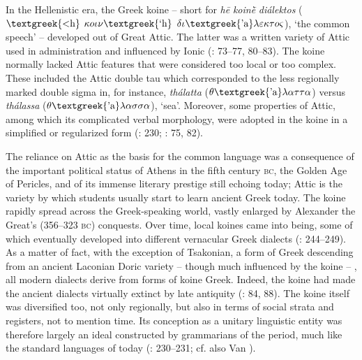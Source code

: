 In the Hellenistic era, the Greek koine – short for \textit{hē} \textit{koinḕ} \textit{diálektos} ($\text{\textgreek{<h}}$ $\kappa o\iota \nu \text{\textgreek{`h}}$ $\delta \iota \text{\textgreek{'a}}\lambda \varepsilon \kappa \tau o\varsigma $), ‘the common speech’ – developed out of Great Attic. The latter was a written variety of Attic used in administration and influenced by Ionic (\citealt{Horrocks2010}: 73–77, 80–83). The koine normally lacked Attic features that were considered too local or too complex. These included the Attic double tau which corresponded to the less regionally marked double sigma in, for instance, \textit{thálatta} ($\theta \text{\textgreek{'a}}\lambda \alpha \tau \tau \alpha $) versus \textit{thálassa} ($\theta \text{\textgreek{'a}}\lambda \alpha \sigma \sigma \alpha $), ‘sea’. Moreover, some properties of Attic, among which its complicated verbal morphology, were adopted in the koine in a simplified or regularized form (\citealt{Brixhe2010}: 230; \citealt{Horrocks2010}: 75, 82).

The reliance on Attic as the basis for the common language was a consequence of the important political status of Athens in the fifth century \textsc{bc}, the Golden Age of Pericles, and of its immense literary prestige still echoing today; Attic is the variety by which students usually start to learn ancient Greek today. The koine rapidly spread across the Greek-speaking world, vastly enlarged by Alexander the Great’s (356–323 \textsc{bc}) conquests. Over time, local koines came into being, some of which eventually developed into different vernacular Greek dialects (\citealt{Brixhe2010}: 244–249). As a matter of fact, with the exception of Tsakonian, a form of Greek descending from an ancient Laconian Doric variety – though much influenced by the koine – \citep[88]{Horrocks2010}, all modern dialects derive from forms of koine Greek. Indeed, the koine had made the ancient dialects virtually extinct by late antiquity (\citealt{Horrocks2010}: 84, 88). The koine itself was diversified too, not only regionally, but also in terms of social strata and registers, not to mention time. Its conception as a unitary linguistic entity was therefore largely an ideal constructed by grammarians of the period, much like the standard languages of today (\citealt{Brixhe2010}: 230–231; cf. also Van \citealt{Rooy2016b}).

